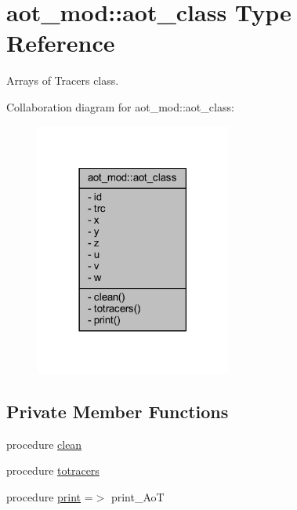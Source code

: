 \hypertarget{structaot__mod_1_1aot__class}{}\section{aot\+\_\+mod\+:\+:aot\+\_\+class Type Reference}
\label{structaot__mod_1_1aot__class}


Arrays of Tracers class.  




Collaboration diagram for aot\+\_\+mod\+:\+:aot\+\_\+class\+:\nopagebreak
\begin{figure}[H]
\begin{center}
\leavevmode
\includegraphics[width=182pt]{structaot__mod_1_1aot__class__coll__graph}
\end{center}
\end{figure}
\subsection*{Private Member Functions}
\begin{DoxyCompactItemize}
\item 
procedure \mbox{\hyperlink{structaot__mod_1_1aot__class_aab1eb00e5cd2868ff08fcd5bb1529688}{clean}}
\item 
procedure \mbox{\hyperlink{structaot__mod_1_1aot__class_a834962484645337446945ae834ea5293}{totracers}}
\item 
procedure \mbox{\hyperlink{structaot__mod_1_1aot__class_a92925f914d4cc5f252e4ca638e104628}{print}} =$>$ print\+\_\+\+AoT
\end{DoxyCompactItemize}
